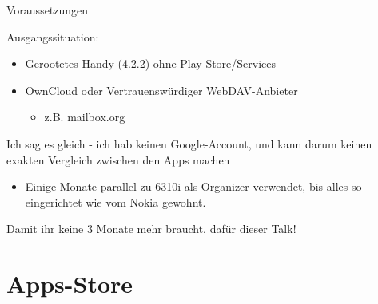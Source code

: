 \documentclass{beamer}
\begin{document}
\begin{frame}{Voraussetzungen}

  Ausgangssituation:
\begin{itemize}
  \item Gerootetes Handy (4.2.2) ohne Play-Store/Services
  \item OwnCloud oder Vertrauenswürdiger WebDAV-Anbieter
    \begin{itemize}
      \item z.B. mailbox.org
    \end{itemize}

\end{itemize}

  \vspace{1cm}
Ich sag es gleich - ich hab keinen Google-Account, und kann darum keinen exakten Vergleich zwischen den Apps machen
  \vspace{1cm}

\pause

\begin{itemize}
  \item Einige Monate parallel zu 6310i als Organizer verwendet, bis alles so eingerichtet wie vom Nokia gewohnt.
\end{itemize}

Damit ihr keine 3 Monate mehr braucht, dafür dieser Talk!

\end{frame}

\section{Apps-Store}
\end{document}
